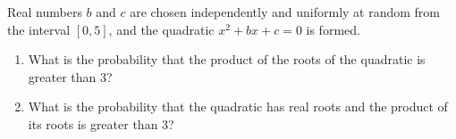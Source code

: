 Real numbers $b$ and $c$ are chosen independently and uniformly at random from the interval $[0,5]$, and the quadratic $x^2+bx+c=0$ is formed.
\begin{enumerate}
\item[(a)] What is the probability that the product of the roots of the quadratic is greater than $3$?
\item[(b)] What is the probability that the quadratic has real roots and the product of its roots is greater than $3$?
\end{enumerate}
